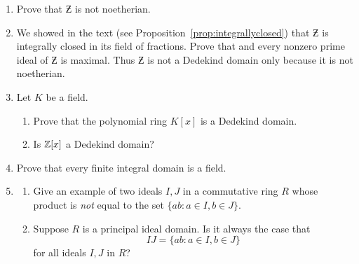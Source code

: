 \begin{enumerate}
\item Prove that $\Zbar$ is not noetherian. %






\item We showed in the text (see
  Proposition~\ref{prop:integrallyclosed}) that $\Zbar$ is integrally
  closed in its field of fractions.  Prove that and every nonzero
  prime ideal of $\Zbar$ is maximal.  Thus $\Zbar$ is not a Dedekind
  domain only because it is not noetherian.

\item Let $K$ be a field.  
\begin{enumerate}
\item Prove that the polynomial ring $K[x]$
is a Dedekind domain.
\item Is $\mathbb{Z}[x]$ a Dedekind domain?
\end{enumerate}

\item \label{ex:finitedomain} 
Prove that every finite integral domain is a field.

\item \label{ex:idealprod} 
\begin{enumerate}
\item Give an example of two ideals $I, J$ in a
commutative ring $R$ whose product is {\em not} equal to the set
$\{ab : a \in I, b \in J\}$. 
\item Suppose $R$ is a principal ideal domain.   
Is it always the case that 
$$ 
IJ = \{ab : a \in I, b \in J\}
$$
for all ideals $I, J$ in $R$?
\end{enumerate}


\end{enumerate}
